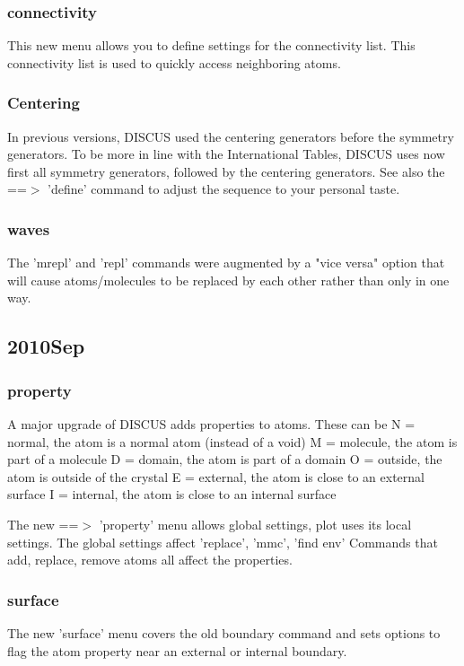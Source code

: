 \subsubsection{connectivity}
\par
This new menu allows you to define settings for the connectivity 
list. This connectivity list is used to quickly access neighboring 
atoms. 
\subsubsection{Centering}
\par
In previous versions, DISCUS used the centering generators before 
the symmetry generators. 
To be more in line with the International Tables, DISCUS uses now 
first all symmetry generators, followed by the centering generators. 
See also the ==$> $ 'define' command to adjust the sequence to your 
personal taste. 
\subsubsection{waves}
\par
The 'mrepl' and 'repl' commands were augmented by a "vice versa" 
option that will cause atoms/molecules to be replaced by each other 
rather than only in one way. 
\subsection*{2010Sep}
\subsubsection{property}
\par
A major upgrade of DISCUS adds properties to atoms. These can be 
N = normal,   the atom is a normal atom (instead of a void) 
M = molecule, the atom is part of a molecule 
D = domain,   the atom is part of a domain 
O = outside,  the atom is outside of the crystal 
E = external, the atom is close to an external surface 
I = internal, the atom is close to an internal surface 
\par
The new ==$> $ 'property' menu allows global settings, plot uses its local 
settings. 
The global settings affect 'replace', 'mmc', 'find env' 
Commands that add, replace, remove atoms all affect the properties. 
\subsubsection{surface}
\par
The new 'surface' menu covers the old boundary command and sets 
options to flag the atom property near an external or internal boundary. 

